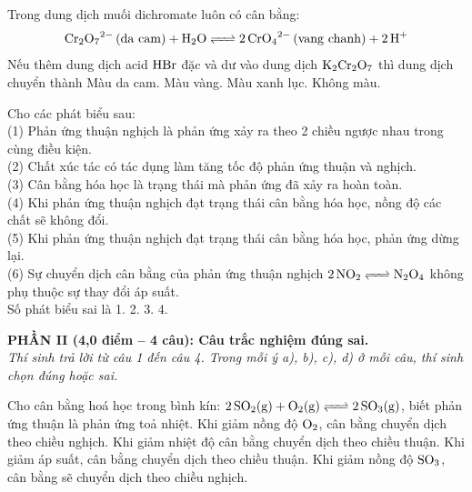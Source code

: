 \documentclass[12pt,a4paper]{article}
\begin{document}
\begin{ex}
Trong dung dịch muối dichromate luôn có cân bằng:
\[\ce{Cr2O7^2- (da\ cam) + H2O <=> 2CrO4^2- (vang\ chanh) + 2H+}\]
Nếu thêm dung dịch acid $\ce{HBr}$ đặc và dư vào dung dịch $\ce{K2Cr2O7}$ thì dung dịch chuyển thành
\choice
{Màu da cam.}
{Màu vàng.}
{Màu xanh lục.}
{Không màu.}
\loigiai{}
\end{ex}

\begin{ex}
Cho các phát biểu sau:\\
(1) Phản ứng thuận nghịch là phản ứng xảy ra theo 2 chiều ngược nhau trong cùng điều kiện.\\
(2) Chất xúc tác có tác dụng làm tăng tốc độ phản ứng thuận và nghịch.\\
(3) Cân bằng hóa học là trạng thái mà phản ứng đã xảy ra hoàn toàn.\\
(4) Khi phản ứng thuận nghịch đạt trạng thái cân bằng hóa học, nồng độ các chất sẽ không đổi.\\
(5) Khi phản ứng thuận nghịch đạt trạng thái cân bằng hóa học, phản ứng dừng lại.\\
(6) Sự chuyển dịch cân bằng của phản ứng thuận nghịch $\ce{2NO2 <=> N2O4}$ không phụ thuộc sự thay đổi áp suất.\\
Số phát biểu sai là
\choice
{1.}
{2.}
{3.}
{4.}
\loigiai{}
\end{ex}


\bigskip
\noindent
\textbf{PHẦN II (4,0 điểm -- 4 câu): Câu trắc nghiệm đúng sai.}\\
\textit{Thí sinh trả lời từ câu 1 đến câu 4. Trong mỗi ý a), b), c), d) ở mỗi câu, thí sinh chọn đúng hoặc sai.}

\begin{ex}
Cho cân bằng hoá học trong bình kín: $\ce{2SO2(g) + O2(g) <=> 2SO3(g)}$, biết phản ứng thuận là phản ứng toả nhiệt.
\choiceTF
{Khi giảm nồng độ $\ce{O2}$, cân bằng chuyển dịch theo chiều nghịch.}
{Khi giảm nhiệt độ cân bằng chuyển dịch theo chiều thuận.}
{Khi giảm áp suất, cân bằng chuyển dịch theo chiều thuận.}
{Khi giảm nồng độ $\ce{SO3}$, cân bằng sẽ chuyển dịch theo chiều nghịch.}
\loigiai{}
\end{ex}
\end{document}
